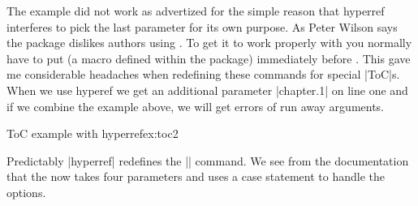 The example did not work as advertized for the simple reason that hyperref interferes to pick the last parameter for its own purpose. As Peter Wilson says the  package dislikes authors using
. To get it to work properly with   you normally have to put  (a macro defined within  the  package) immediately  before . This gave me considerable headaches when redefining these commands for special |ToC|s.
When we use hyperef we get an additional parameter |chapter.1| on line one and if we combine the example above, we will get errors of run away arguments.

\begin{texexample}{ToC example with hyperref}{ex:toc2}
%
\end{texexample}

Predictably |hyperref| redefines the |\contentsline| command. We see from the documentation that 
the  now takes four parameters and uses a case statement to handle the options.
\begin{teXXX}
\def\contentsline#1#2#3#4{%
  \ifx\\#4\\%
    	\csname l@#1\endcsname{#2}{#3}%
  \else
 	\ifcase\Hy@linktoc %
 		\csname l@#1\endcsname{#2}{#3}%
 	\or %
 		\csname l@#1\endcsname{%
  	   \hyper@linkstart{link}{#4}{#2}\hyper@linkend
    	}{#3}%
  	 \or %
		\csname l@#1\endcsname{{#2}}{%
    	\hyper@linkstart{link}{#4}{#3}\hyper@linkend
    	}%
 	\else %
 		\csname l@#1\endcsname{%
 	\hyper@linkstart{link}{#4}{#2}\hyper@linkend
 	}{%
 	\hyper@linkstart{link}{#4}{#3}\hyper@linkend
 	}%
 	\fi
 \fi
}
\end{teXXX}

%

